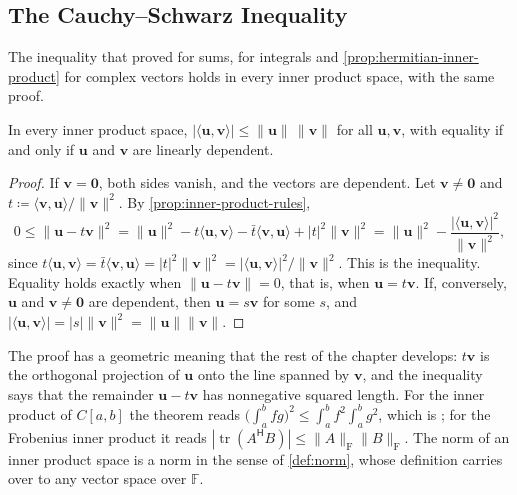 \subsection{The Cauchy--Schwarz Inequality}

The inequality that  proved for sums,  for integrals and \cref{prop:hermitian-inner-product} for complex vectors holds in every inner product space, with the same proof.

\begin{theorem}
\label{thm:cauchy-schwarz-general}
In every inner product space, $|\langle\mathbf u,\mathbf v\rangle|\le\|\mathbf u\|\,\|\mathbf v\|$ for all $\mathbf u,\mathbf v$, with equality if and only if $\mathbf u$ and $\mathbf v$ are linearly dependent.
\end{theorem}

\begin{proof}
If $\mathbf v=\mathbf 0$, both sides vanish, and the vectors are dependent. Let $\mathbf v\ne\mathbf 0$ and $t\coloneqq\langle\mathbf v,\mathbf u\rangle/\|\mathbf v\|^2$. By \cref{prop:inner-product-rules},
\[
0\le\|\mathbf u-t\mathbf v\|^2=\|\mathbf u\|^2-t\langle\mathbf u,\mathbf v\rangle-\bar t\langle\mathbf v,\mathbf u\rangle+|t|^2\|\mathbf v\|^2=\|\mathbf u\|^2-\frac{|\langle\mathbf u,\mathbf v\rangle|^2}{\|\mathbf v\|^2},
\]
since $t\langle\mathbf u,\mathbf v\rangle=\bar t\langle\mathbf v,\mathbf u\rangle=|t|^2\|\mathbf v\|^2=|\langle\mathbf u,\mathbf v\rangle|^2/\|\mathbf v\|^2$. This is the inequality. Equality holds exactly when $\|\mathbf u-t\mathbf v\|=0$, that is, when $\mathbf u=t\mathbf v$. If, conversely, $\mathbf u$ and $\mathbf v\ne\mathbf 0$ are dependent, then $\mathbf u=s\mathbf v$ for some $s$, and $|\langle\mathbf u,\mathbf v\rangle|=|s|\|\mathbf v\|^2=\|\mathbf u\|\|\mathbf v\|$.
\end{proof}

The proof has a geometric meaning that the rest of the chapter develops: $t\mathbf v$ is the orthogonal projection of $\mathbf u$ onto the line spanned by $\mathbf v$, and the inequality says that the remainder $\mathbf u-t\mathbf v$ has nonnegative squared length. For the inner product of $C[a,b]$ the theorem reads $\bigl(\int_a^bfg\bigr)^2\le\int_a^bf^2\int_a^bg^2$, which is ; for the Frobenius inner product it reads $|\operatorname{tr}(A^{\mathsf H}B)|\le\|A\|_{\mathrm F}\|B\|_{\mathrm F}$. The norm of an inner product space is a norm in the sense of \cref{def:norm}, whose definition carries over to any vector space over $\mathbb F$.

